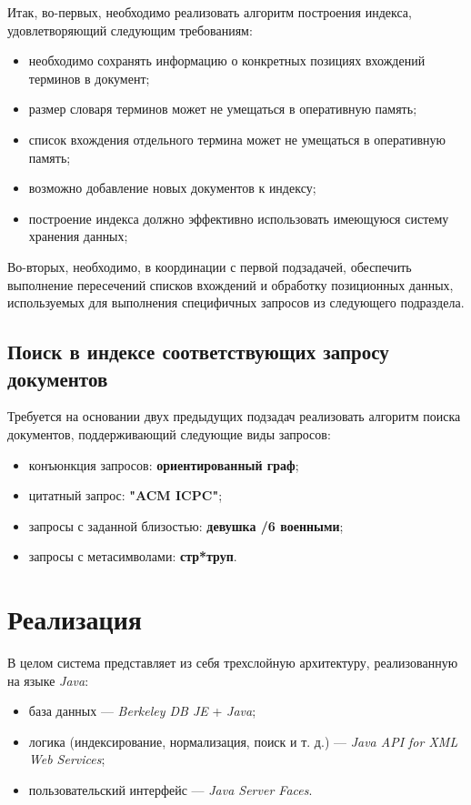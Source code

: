\documentclass[12pt]{article}
\begin{document}
Итак, во-первых, необходимо реализовать алгоритм построения индекса, 
удовлетворяющий следующим требованиям:
\begin{itemize}
\item необходимо сохранять информацию о конкретных позициях вхождений терминов в документ;
\item размер словаря терминов может не умещаться в оперативную память;
\item список вхождения отдельного термина может не умещаться в оперативную память;
\item возможно добавление новых документов к индексу;
\item построение индекса должно эффективно использовать имеющуюся систему хранения данных;
\end{itemize}

Во-вторых, необходимо, в координации с первой подзадачей, обеспечить выполнение
пересечений списков вхождений и обработку позиционных данных, используемых для
выполнения специфичных запросов из следующего подраздела.

\subsection{Поиск в индексе соответствующих запросу документов}
Требуется на основании двух предыдущих подзадач реализовать алгоритм
поиска документов, поддерживающий следующие виды запросов:
\begin{itemize}
\item конъюнкция запросов: \textbf{ориентированный граф};
\item цитатный запрос: \textbf{"ACM ICPC"};
\item запросы с заданной близостью: \textbf{девушка /6 военными};
\item запросы с метасимволами: \textbf{стр*труп}.
\end{itemize}

\section{Реализация}
В целом система представляет из себя трехслойную архитектуру, реализованную на языке \emph{Java}: 
\begin{itemize}
\item база данных --- \emph{Berkeley DB JE} + \emph{Java};
\item логика (индексирование, нормализация, поиск и т. д.) --- \emph{Java API for XML Web Services};
\item пользовательский интерфейс --- \emph{Java Server Faces}.
\end{itemize}
\end{document}
